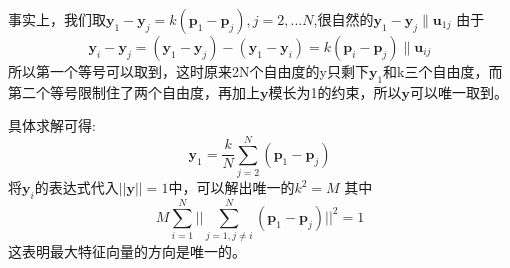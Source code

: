 \documentclass[12pt]{article}
\theoremstyle{remark}
\begin{document}
事实上，我们取$\bm{y}_1-\bm{y}_j=k(\bm{p}_1-\bm{p}_j),j=2,...N$,很自然的$\bm{y}_1-\bm{y}_j\parallel \bm{u}_{1j}$
由于
\[
\bm{y}_i-\bm{y}_j=(\bm{y}_1-\bm{y}_j)-(\bm{y}_1-\bm{y}_i)
=k(\bm{p}_i-\bm{p}_j)\parallel \bm{u}_{ij}
\]
所以第一个等号可以取到，这时原来2N个自由度的y只剩下$\bm{y}_1$和k三个自由度，而第二个等号限制住了两个自由度，再加上$\bm{y}$模长为1的约束，所以$\bm{y}$可以唯一取到。

具体求解可得:
\[
\bm{y}_1=\frac{k}{N}\sum_{j=2}^N (\bm{p}_1-\bm{p}_j)
\]
将$\bm{y}_i$的表达式代入$||\bm{y}||=1$中，可以解出唯一的$k^2=M$
其中
\[
M\sum_{i=1}^N||\sum_{j=1,j\neq i}^N(\bm{p}_1-\bm{p}_j)||^2=1
\]
这表明最大特征向量的方向是唯一的。
\end{document}
